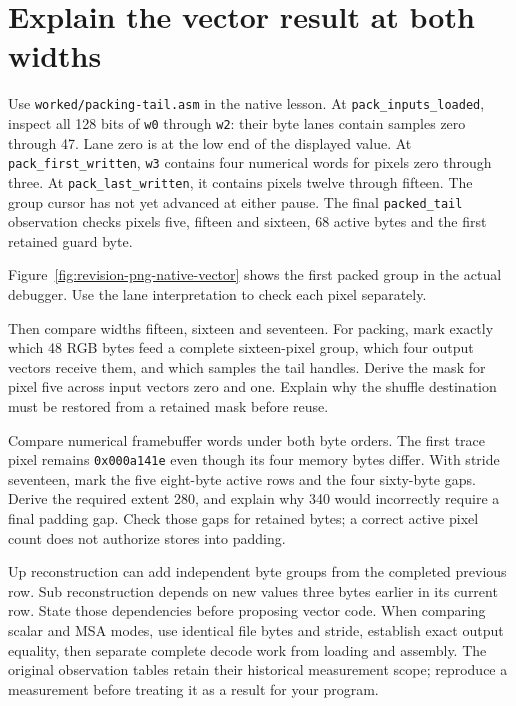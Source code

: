 \section{Explain the vector result at both widths}

Use \texttt{worked/packing-tail.asm} in the native lesson. At
\texttt{pack\_inputs\_loaded}, inspect all 128 bits of \texttt{w0} through
\texttt{w2}: their byte lanes contain samples zero through 47. Lane zero is
at the low end of the displayed value. At \texttt{pack\_first\_written},
\texttt{w3} contains four numerical words for pixels zero through three.
At \texttt{pack\_last\_written}, it contains pixels twelve through fifteen.
The group cursor has not yet advanced at either pause. The final
\texttt{packed\_tail} observation checks pixels five, fifteen and sixteen,
68 active bytes and the first retained guard byte.

Figure~\ref{fig:revision-png-native-vector} shows the first packed group in the
actual debugger. Use the lane interpretation to check each pixel separately.



Then compare widths fifteen, sixteen and seventeen. For packing, mark exactly which
48 RGB bytes feed a complete sixteen-pixel group, which four output vectors
receive them, and which samples the tail handles. Derive the mask for pixel
five across input vectors zero and one. Explain why the shuffle destination
must be restored from a retained mask before reuse.

Compare numerical framebuffer words under both byte orders. The first trace
pixel remains \texttt{0x000a141e} even though its four memory bytes differ.
With stride seventeen, mark the five eight-byte active rows and the four
sixty-byte gaps. Derive the required extent 280, and explain why 340 would
incorrectly require a final padding gap. Check those gaps for retained bytes;
a correct active pixel count does not authorize stores into padding.

Up reconstruction can add independent byte groups from the completed previous
row. Sub reconstruction depends on new values three bytes earlier in its
current row. State those dependencies before proposing vector code. When
comparing scalar and MSA modes, use identical file bytes and stride, establish
exact output equality, then separate complete decode work from loading and
assembly. The original observation tables retain their historical measurement
scope; reproduce a measurement before treating it as a result for your program.

